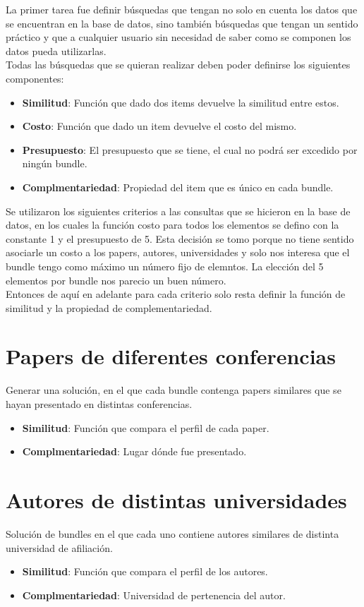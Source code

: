 La primer tarea fue definir búsquedas que tengan no solo en cuenta los datos que se encuentran en la base de datos, sino también búsquedas que tengan un sentido práctico y que a cualquier usuario sin necesidad de saber como se componen los datos pueda utilizarlas.\\
Todas las búsquedas que se quieran realizar deben poder definirse los siguientes componentes:
\begin{itemize}
  \item \textbf{Similitud}: Función que dado dos items devuelve la similitud entre estos.
  \item \textbf{Costo}: Función que dado un item devuelve el costo del mismo.
  \item \textbf{Presupuesto}: El presupuesto que se tiene, el cual no podrá ser excedido por ningún bundle.
  \item \textbf{Complmentariedad}: Propiedad del item que es único en cada bundle.
\end{itemize}

Se utilizaron los siguientes criterios a las consultas que se hicieron en la base de datos, en los cuales la función costo para todos los elementos se defino con la constante 1 y el presupuesto de 5. Esta decisión se tomo porque no tiene sentido asociarle un costo a los papers, autores, universidades y solo nos interesa que el bundle tengo como máximo un número fijo de elemntos. La elección del 5 elementos por bundle nos parecio un buen número.\\
Entonces de aquí en adelante para cada criterio solo resta definir la función de similitud y la propiedad de complementariedad.

\section{Papers de diferentes conferencias}\label{bus:papSimDisLug}
Generar una solución, en el que cada bundle contenga 
papers similares que se hayan presentado en distintas conferencias.\\
\begin{itemize}
  \item \textbf{Similitud}: Función que compara el perfil de cada paper.
  \item \textbf{Complmentariedad}: Lugar dónde fue presentado.
\end{itemize}

\section{Autores de distintas universidades}
Solución de bundles en el que cada uno contiene autores 
similares de distinta universidad de afiliación.\\
\begin{itemize}
  \item \textbf{Similitud}: Función que compara el perfil de los autores.
  \item \textbf{Complmentariedad}: Universidad de pertenencia del autor.
\end{itemize}

